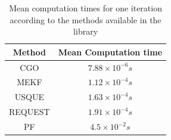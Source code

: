 \begin{table}[!h]
\centering
\begin{tabular}{|c|c|}
\hline
Method & Mean Computation time \\
\hline
\hline
CGO & $7.88 \times 10^{-6} s$\rule[-2pt]{0pt}{10pt}\\
 \hline
MEKF & $1.12\times 10^{-4} s$\rule[-2pt]{0pt}{10pt}\\
 \hline
 USQUE & $1.63\times 10^{-4} s $\rule[-2pt]{0pt}{10pt}\\
 \hline
REQUEST& $1.91\times 10^{-4} s$ \rule[-2pt]{0pt}{10pt} \\
 \hline
PF & $4.5\times 10^{-2} s$\rule[-2pt]{0pt}{10pt}\\
 \hline
\end{tabular}
\caption{Mean computation times for one iteration according to the methods available in the library}
\label{mean_time}
\end{table}



